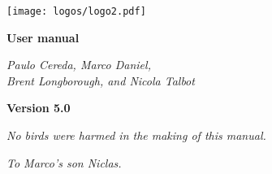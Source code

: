 \documentclass[a4paper,oneside,12pt]{memoir}
\newcommand{\araraversion}{5.0}
\begin{document}
\begin{titlingpage}
\vspace*{2em}

\begin{center}
\texttt{[image: logos/logo2.pdf]}

\vspace{4em}

\begin{tcolorbox}[
  boxrule=0pt,
  colback=araracolour,
  top=1em,
  bottom=1em
]
  \color{white}
  \centering
  \Huge
  \sffamily
  \bfseries User manual
\end{tcolorbox}

\vspace{6em}

{\large\em Paulo Cereda, Marco Daniel,\\
Brent Longborough, and Nicola Talbot\par}

\vspace{3em}

\href{mailto:cereda.paulo@gmail.com}{}%
\quad\href{https://github.com/cereda/arara}{}%
\quad\href{http://twitter.com/paulocereda}{}

\vfill

{\color{araracolour}
\LARGE
\sffamily
\bfseries
Version \araraversion}

\end{center}
\end{titlingpage}

\pagestyle{headings}
\frontmatter
\nouppercaseheads

\cleardoublepage

\vspace*{25em}

\begin{flushright}
\em No birds were harmed in the making of this manual.
\end{flushright}




\printunsrtglossary

\cleardoublepage

\vspace*{25em}

\thispagestyle{empty}
\begin{flushright}
\em To Marco's son Niclas.
\end{flushright}

\cleardoublepage
\end{document}
